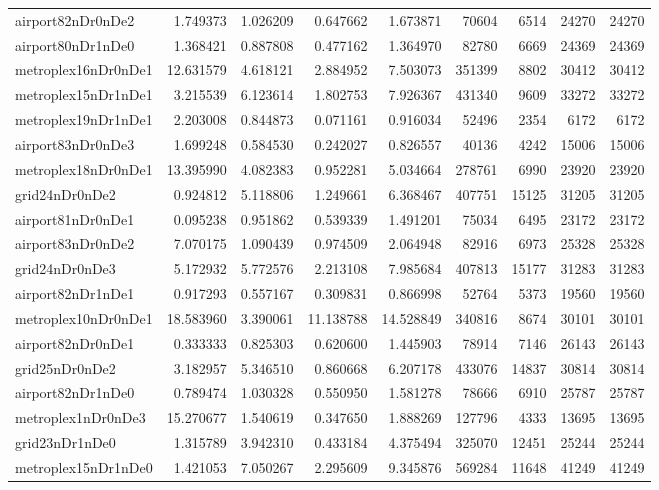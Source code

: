 \begin{longtable}{|l|r|r|r|r|r|r|r|r|}
airport82nDr0nDe2 & 1.749373 & 1.026209 & 0.647662 & 1.673871 & 70604 & 6514 & 24270 & 24270 \\
airport80nDr1nDe0 & 1.368421 & 0.887808 & 0.477162 & 1.364970 & 82780 & 6669 & 24369 & 24369 \\
metroplex16nDr0nDe1 & 12.631579 & 4.618121 & 2.884952 & 7.503073 & 351399 & 8802 & 30412 & 30412 \\
metroplex15nDr1nDe1 & 3.215539 & 6.123614 & 1.802753 & 7.926367 & 431340 & 9609 & 33272 & 33272 \\
metroplex19nDr1nDe1 & 2.203008 & 0.844873 & 0.071161 & 0.916034 & 52496 & 2354 & 6172 & 6172 \\
airport83nDr0nDe3 & 1.699248 & 0.584530 & 0.242027 & 0.826557 & 40136 & 4242 & 15006 & 15006 \\
metroplex18nDr0nDe1 & 13.395990 & 4.082383 & 0.952281 & 5.034664 & 278761 & 6990 & 23920 & 23920 \\
grid24nDr0nDe2 & 0.924812 & 5.118806 & 1.249661 & 6.368467 & 407751 & 15125 & 31205 & 31205 \\
airport81nDr0nDe1 & 0.095238 & 0.951862 & 0.539339 & 1.491201 & 75034 & 6495 & 23172 & 23172 \\
airport83nDr0nDe2 & 7.070175 & 1.090439 & 0.974509 & 2.064948 & 82916 & 6973 & 25328 & 25328 \\
grid24nDr0nDe3 & 5.172932 & 5.772576 & 2.213108 & 7.985684 & 407813 & 15177 & 31283 & 31283 \\
airport82nDr1nDe1 & 0.917293 & 0.557167 & 0.309831 & 0.866998 & 52764 & 5373 & 19560 & 19560 \\
metroplex10nDr0nDe1 & 18.583960 & 3.390061 & 11.138788 & 14.528849 & 340816 & 8674 & 30101 & 30101 \\
airport82nDr0nDe1 & 0.333333 & 0.825303 & 0.620600 & 1.445903 & 78914 & 7146 & 26143 & 26143 \\
grid25nDr0nDe2 & 3.182957 & 5.346510 & 0.860668 & 6.207178 & 433076 & 14837 & 30814 & 30814 \\
airport82nDr1nDe0 & 0.789474 & 1.030328 & 0.550950 & 1.581278 & 78666 & 6910 & 25787 & 25787 \\
metroplex1nDr0nDe3 & 15.270677 & 1.540619 & 0.347650 & 1.888269 & 127796 & 4333 & 13695 & 13695 \\
grid23nDr1nDe0 & 1.315789 & 3.942310 & 0.433184 & 4.375494 & 325070 & 12451 & 25244 & 25244 \\
metroplex15nDr1nDe0 & 1.421053 & 7.050267 & 2.295609 & 9.345876 & 569284 & 11648 & 41249 & 41249 \\

\end{longtable}
